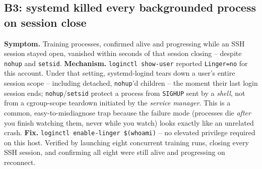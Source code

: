 \documentclass{article}
\begin{document}
\subsection{B3: systemd killed every backgrounded process on session close}
\textbf{Symptom.} Training processes, confirmed alive and progressing while an SSH session stayed open, vanished within seconds of that session closing -- despite \texttt{nohup} and \texttt{setsid}.
\textbf{Mechanism.} \texttt{loginctl show-user} reported \texttt{Linger=no} for this account. Under that setting, systemd-logind tears down a user's entire session scope -- including detached, \texttt{nohup}'d children -- the moment their last login session ends; \texttt{nohup}/\texttt{setsid} protect a process from \texttt{SIGHUP} sent by a \emph{shell}, not from a cgroup-scope teardown initiated by the \emph{service manager}. This is a common, easy-to-misdiagnose trap because the failure mode (processes die \emph{after} you finish watching them, never while you watch) looks exactly like an unrelated crash.
\textbf{Fix.} \texttt{loginctl enable-linger \$(whoami)} -- no elevated privilege required on this host. Verified by launching eight concurrent training runs, closing every SSH session, and confirming all eight were still alive and progressing on reconnect.
\end{document}
